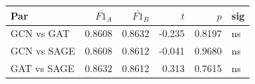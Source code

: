 \begin{tabular}{lrrrrl}
\toprule
Par & $\bar{F1}_A$ & $\bar{F1}_B$ & $t$ & $p$ & sig \\
\midrule
GCN vs GAT & 0.8608 & 0.8632 & -0.235 & 0.8197 & ns \\
GCN vs SAGE & 0.8608 & 0.8612 & -0.041 & 0.9680 & ns \\
GAT vs SAGE & 0.8632 & 0.8612 & 0.313 & 0.7615 & ns \\
\bottomrule
\end{tabular}
